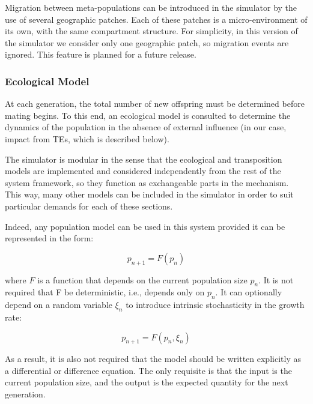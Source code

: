 \documentclass[10pt]{article}
\begin{document}
Migration between meta-populations can be introduced in the simulator
by the use of several geographic patches. Each of these patches is a
micro-environment of its own, with the same compartment structure. For
simplicity, in this version of the simulator we consider only one
geographic patch, so migration events are ignored. This feature is
planned for a future release.



\subsubsection{Ecological Model}

At each generation, the total number of new offspring must be
determined before mating begins. To this end, an ecological model is
consulted to determine the dynamics of the population in the absence
of external influence (in our case, impact from TEs, which is
described below).

The simulator is modular in the sense that the ecological and
transposition models are implemented and considered independently from
the rest of the system framework, so they function as exchangeable
parts in the mechanism. This way, many other models can be included in
the simulator in order to suit particular demands for each of these
sections. 

Indeed, any population model can be used in this system provided it
can be represented in the form:

\begin{equation}
  p_{n+1} = F(p_n)
\end{equation}

where $F$ is a function that depends on the current population size
$p_n$. It is not required that F be deterministic, i.e., depends only
on $p_n$. It can optionally depend on a random variable $\xi_n$ to
introduce intrinsic stochasticity in the growth rate:

\begin{equation}
  p_{n+1} = F(p_n,\xi_n)
\end{equation}

As a result, it is also not required that the model should be written
explicitly as a differential or difference equation. The only
requisite is that the input is the current population size, and the
output is the expected quantity for the next generation.
\end{document}
